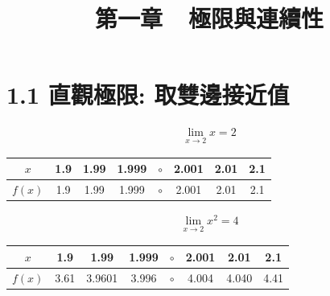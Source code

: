 \documentclass[12pt]{extarticle}
\theoremstyle{definition}
\begin{document}
\title{\texorpdfstring{\vspace{-16mm} 第一章\ \ 極限與連續性}{第一章\ \ 極限與連續性}} 
\author{\vspace{-4em}}
\date{\vspace{-4em}}
\maketitle
\thispagestyle{firststyle}


\section*{1.1 直觀極限: 取雙邊接近值}
\vspace{2mm}
\begin{minipage}{0.23\textwidth}
\begin{align*}
  \lim_{x\to 2}x = 2
\end{align*}
\end{minipage}
\qquad
\begin{minipage}{0.77\textwidth}
  \begin{tabular}{cccccccc}
    \toprule
    $x$ & 1.9 & 1.99 & 1.999 & $\circ$ & 2.001 & 2.01 & 2.1 \\
    \hline
    \addlinespace[2mm]
    $f(x)$ & 1.9 & 1.99 & 1.999 & $\circ$ & 2.001 & 2.01 & 2.1 \\
    \bottomrule
  \end{tabular}
\end{minipage}

\vspace{5mm}

\hspace{-7mm}
\begin{minipage}{0.23\textwidth}
\begin{align*}
  \lim_{x\to 2}x^2 = 4
\end{align*}
\end{minipage}
\qquad
\begin{minipage}{0.77\textwidth}
  \begin{tabular}{cccccccc}
    \toprule
    $x$ & 1.9 & 1.99 & 1.999 & $\circ$ & 2.001 & 2.01 & 2.1 \\
    \hline
    \addlinespace[2mm]
    $f(x)$ & 3.61 & 3.9601 & 3.996 & $\circ$ & 4.004 & 4.040 & 4.41 \\
    \bottomrule
  \end{tabular}
\end{minipage}
\end{document}
